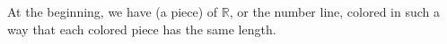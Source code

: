 \documentclass[]{standalone}
\begin{document}
\begin{minipage}{30ex}
    At the beginning, we have (a piece) of $\mathbb{R}$, or the number line,
    colored in such a way that each colored piece has the same length.
\end{minipage}
\end{document}
